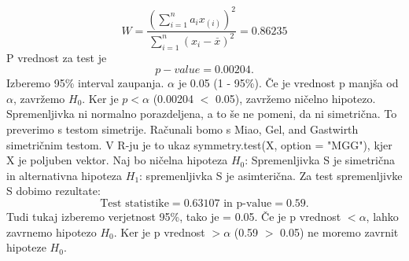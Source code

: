 \documentclass[a4paper,11pt]{article}
\begin{document}
\[W = \frac{(\sum_{i = 1}^{n}a_i x_{(i)})^2}{\sum_{i = 1}^{n}(x_i - \overset{\_}{x})^2} = 0.86235\]
 P vrednost za test je 
\[ p-value = 0.00204. \]
Izberemo 95\% interval zaupanja. \(\alpha\) je 0.05 (1 - 95\%). Če je vrednost p manjša od \(\alpha\), zavržemo \(H_0\). Ker je \(p < \alpha\) (0.00204 \(<\) 0.05), zavržemo ničelno hipotezo. Spremenljivka ni normalno porazdeljena, a to še ne pomeni, da ni simetrična. To preverimo s testom simetrije. Računali bomo s Miao, Gel, and Gastwirth simetričnim testom. V R-ju je to ukaz symmetry.test(X, option = "MGG")\cite{lawstat}, kjer X je poljuben vektor. Naj bo ničelna hipoteza \(H_0\): Spremenljivka S je simetrična in alternativna hipoteza \(H_1\): spremenljivka S je asimterična. Za test spremenljivke S dobimo rezultate:
\[\text{Test statistike} = 0.63107 \text{ in p-value} =  0.59.\]
Tudi tukaj izberemo verjetnost 95\%, tako je \alpha = 0.05. Če je p vrednost \(< \alpha\), lahko zavrnemo hipotezo \(H_0\). Ker je p vrednost \(> \alpha\) (0.59 \(>\) 0.05) ne moremo zavrnit hipoteze \(H_0\).
\end{document}
